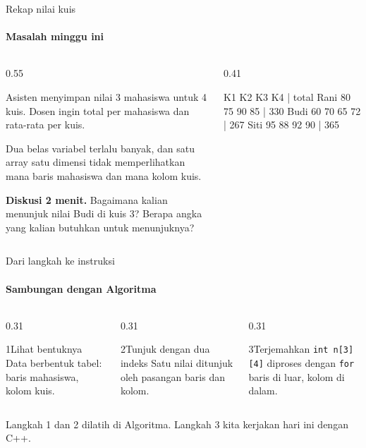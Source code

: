 \documentclass[t]{beamer}
\begin{document}

\begin{frame}[fragile]{Rekap nilai kuis}
\framesubtitle{Masalah minggu ini}
\begin{columns}[T]
\begin{column}{0.55\textwidth}
{Asisten menyimpan nilai 3 mahasiswa untuk 4 kuis. Dosen ingin total per mahasiswa dan rata-rata per kuis.

\vspace{6pt}
Dua belas variabel terlalu banyak, dan satu array satu dimensi tidak memperlihatkan mana baris mahasiswa dan mana kolom kuis.\par}
\vspace{6pt}
\begin{Catatan}
\textbf{Diskusi 2 menit.} Bagaimana kalian menunjuk nilai Budi di kuis 3? Berapa angka yang kalian butuhkan untuk menunjuknya?
\end{Catatan}
\end{column}
\begin{column}{0.41\textwidth}
\begin{Keluaran}[]
       K1 K2 K3 K4 | total
Rani   80 75 90 85 | 330
Budi   60 70 65 72 | 267
Siti   95 88 92 90 | 365
\end{Keluaran}
\end{column}
\end{columns}
\end{frame}

\begin{frame}{Dari langkah ke instruksi}
\framesubtitle{Sambungan dengan Algoritma}
\begin{columns}[T]
\begin{column}{0.31\textwidth}
\begin{Langkah}{1}{Lihat bentuknya}
Data berbentuk tabel: baris mahasiswa, kolom kuis.
\end{Langkah}
\end{column}
\begin{column}{0.31\textwidth}
\begin{Langkah}{2}{Tunjuk dengan dua indeks}
Satu nilai ditunjuk oleh pasangan baris dan kolom.
\end{Langkah}
\end{column}
\begin{column}{0.31\textwidth}
\begin{Langkah}{3}{Terjemahkan}
\texttt{int n[3][4]} diproses dengan \texttt{for} baris di luar, kolom di dalam.
\end{Langkah}
\end{column}
\end{columns}
\vspace{10pt}
Langkah 1 dan 2 dilatih di Algoritma. Langkah 3 kita kerjakan hari ini dengan C++.
\end{frame}
\end{document}
